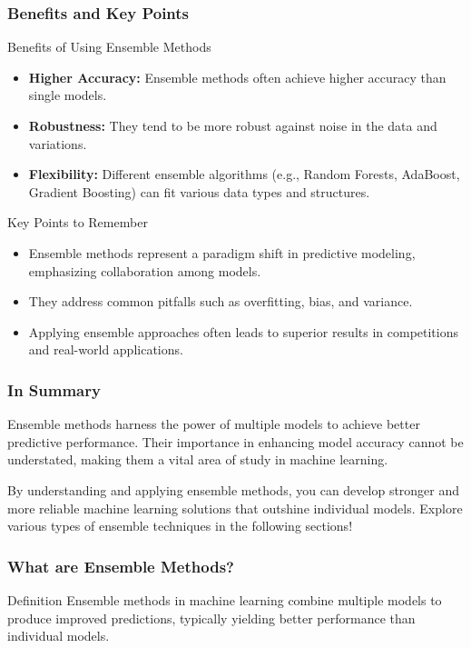 \documentclass[aspectratio=169]{beamer}
\begin{document}
\begin{frame}[fragile]
    \frametitle{Benefits and Key Points}
    \begin{block}{Benefits of Using Ensemble Methods}
        \begin{itemize}
            \item \textbf{Higher Accuracy:} Ensemble methods often achieve higher accuracy than single models.
            \item \textbf{Robustness:} They tend to be more robust against noise in the data and variations.
            \item \textbf{Flexibility:} Different ensemble algorithms (e.g., Random Forests, AdaBoost, Gradient Boosting) can fit various data types and structures.
        \end{itemize}
    \end{block}
    
    \begin{block}{Key Points to Remember}
        \begin{itemize}
            \item Ensemble methods represent a paradigm shift in predictive modeling, emphasizing collaboration among models.
            \item They address common pitfalls such as overfitting, bias, and variance.
            \item Applying ensemble approaches often leads to superior results in competitions and real-world applications.
        \end{itemize}
    \end{block}
\end{frame}

\begin{frame}[fragile]
    \frametitle{In Summary}
    Ensemble methods harness the power of multiple models to achieve better predictive performance. Their importance in enhancing model accuracy cannot be understated, making them a vital area of study in machine learning.

    By understanding and applying ensemble methods, you can develop stronger and more reliable machine learning solutions that outshine individual models. Explore various types of ensemble techniques in the following sections!
\end{frame}

\begin{frame}[fragile]
    \frametitle{What are Ensemble Methods?}
    \begin{block}{Definition}
        Ensemble methods in machine learning combine multiple models to produce improved predictions, typically yielding better performance than individual models.
    \end{block}
\end{frame}
\end{document}
